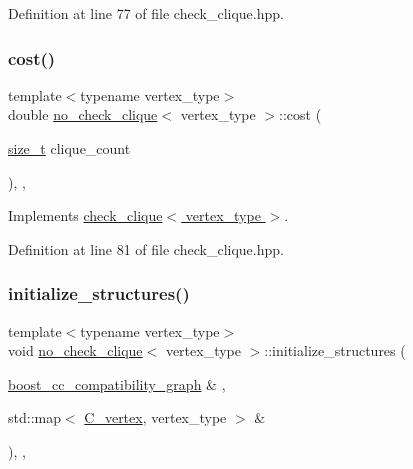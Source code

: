 Definition at line 77 of file check\+\_\+clique.\+hpp.

\mbox{\label{structno__check__clique_a9ab6b6c35b470916b74d86e15b2e024c}} 
\subsubsection{\texorpdfstring{cost()}{cost()}}
{\footnotesize\ttfamily template$<$typename vertex\+\_\+type$>$ \\
double \hyperlink{structno__check__clique}{no\+\_\+check\+\_\+clique}$<$ vertex\+\_\+type $>$\+::cost (\begin{DoxyParamCaption}\item[{\hyperlink{tutorial__fpt__2017_2intro_2sixth_2test_8c_a7c94ea6f8948649f8d181ae55911eeaf}{size\+\_\+t}}]{clique\+\_\+count }\end{DoxyParamCaption})\hspace{0.3cm}{\ttfamily [inline]}, {\ttfamily [override]}, {\ttfamily [virtual]}}



Implements \hyperlink{structcheck__clique_a81f12b024d09699d522ed560c0a96ff6}{check\+\_\+clique$<$ vertex\+\_\+type $>$}.



Definition at line 81 of file check\+\_\+clique.\+hpp.

\mbox{\label{structno__check__clique_ada91909ec207beafc1907b4236ede31c}} 
\subsubsection{\texorpdfstring{initialize\+\_\+structures()}{initialize\_structures()}}
{\footnotesize\ttfamily template$<$typename vertex\+\_\+type$>$ \\
void \hyperlink{structno__check__clique}{no\+\_\+check\+\_\+clique}$<$ vertex\+\_\+type $>$\+::initialize\+\_\+structures (\begin{DoxyParamCaption}\item[{\hyperlink{clique__covering__graph_8hpp_af47b1c28cf9a2c360afafb8d80582ce6}{boost\+\_\+cc\+\_\+compatibility\+\_\+graph} \&}]{,  }\item[{std\+::map$<$ \hyperlink{clique__covering__graph_8hpp_a9cb45047ea8c5ed95a8cfa90494345aa}{C\+\_\+vertex}, vertex\+\_\+type $>$ \&}]{ }\end{DoxyParamCaption})\hspace{0.3cm}{\ttfamily [inline]}, {\ttfamily [override]}, {\ttfamily [virtual]}}



